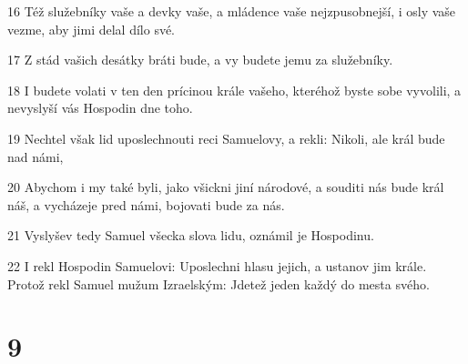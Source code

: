 \par 16 Též služebníky vaše a devky vaše, a mládence vaše nejzpusobnejší, i osly vaše vezme, aby jimi delal dílo své.
\par 17 Z stád vašich desátky bráti bude, a vy budete jemu za služebníky.
\par 18 I budete volati v ten den prícinou krále vašeho, kteréhož byste sobe vyvolili, a nevyslyší vás Hospodin dne toho.
\par 19 Nechtel však lid uposlechnouti reci Samuelovy, a rekli: Nikoli, ale král bude nad námi,
\par 20 Abychom i my také byli, jako všickni jiní národové, a souditi nás bude král náš, a vycházeje pred námi, bojovati bude za nás.
\par 21 Vyslyšev tedy Samuel všecka slova lidu, oznámil je Hospodinu.
\par 22 I rekl Hospodin Samuelovi: Uposlechni hlasu jejich, a ustanov jim krále. Protož rekl Samuel mužum Izraelským: Jdetež jeden každý do mesta svého.

\chapter{9}

